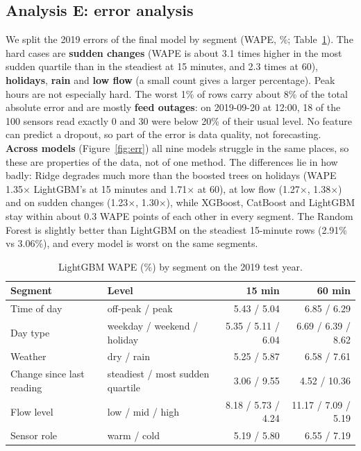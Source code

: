 ﻿\documentclass[11pt,a4paper]{article}
\begin{document}
\subsection{Analysis E: error analysis}
We split the 2019 errors of the final model by segment (WAPE, \%; Table~\ref{tab:err}). The hard cases are \textbf{sudden changes} (WAPE is about 3.1 times higher in the most sudden quartile than in the steadiest at 15 minutes, and 2.3 times at 60), \textbf{holidays}, \textbf{rain} and \textbf{low flow} (a small count gives a larger percentage). Peak hours are not especially hard.
The worst 1\% of rows carry about 8\% of the total absolute error and are mostly \textbf{feed outages}: on 2019-09-20 at 12:00, 18 of the 100 sensors read exactly 0 and 30 were below 20\% of their usual level. No feature can predict a dropout, so part of the error is data quality, not forecasting.
\textbf{Across models} (Figure~\ref{fig:err}) all nine models struggle in the same places, so these are properties of the data, not of one method. The differences lie in how badly: Ridge degrades much more than the boosted trees on holidays (WAPE 1.35$\times$ LightGBM's at 15 minutes and 1.71$\times$ at 60), at low flow (1.27$\times$, 1.38$\times$) and on sudden changes (1.23$\times$, 1.30$\times$), while XGBoost, CatBoost and LightGBM stay within about 0.3 WAPE points of each other in every segment. The Random Forest is slightly better than LightGBM on the steadiest 15-minute rows (2.91\% vs 3.06\%), and every model is worst on the same segments.

\begin{table}[H]\centering\small
\begin{tabular}{llrr}
\toprule Segment & Level & 15 min & 60 min \\ \midrule
Time of day & off-peak / peak & 5.43 / 5.04 & 6.85 / 6.29 \\
Day type & weekday / weekend / holiday & 5.35 / 5.11 / 6.04 & 6.69 / 6.39 / 8.62 \\
Weather & dry / rain & 5.25 / 5.87 & 6.58 / 7.61 \\
Change since last reading & steadiest / most sudden quartile & 3.06 / 9.55 & 4.52 / 10.36 \\
Flow level & low / mid / high & 8.18 / 5.73 / 4.24 & 11.17 / 7.09 / 5.19 \\
Sensor role & warm / cold & 5.19 / 5.80 & 6.55 / 7.19 \\ \bottomrule
\end{tabular}
\caption{LightGBM WAPE (\%) by segment on the 2019 test year.}\label{tab:err}
\end{table}
\end{document}
